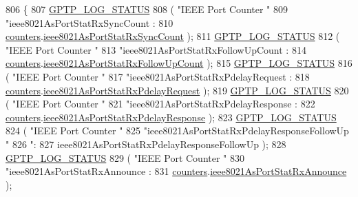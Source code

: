 \begin{DoxyCode}
806     \{
807         \hyperlink{gptp__log_8hpp_a9bcf107d6f77d335b92bbc4825ea85a3}{GPTP\_LOG\_STATUS}
808             ( \textcolor{stringliteral}{"IEEE Port Counter "}
809               \textcolor{stringliteral}{"ieee8021AsPortStatRxSyncCount : %
810               \hyperlink{class_common_port_aa7b0659a6104355b95878f69b0aefb69}{counters}.\hyperlink{struct_port_counters__t_ac36dc6016c10e50c7bc588bd0b9c3215}{ieee8021AsPortStatRxSyncCount} );
811         \hyperlink{gptp__log_8hpp_a9bcf107d6f77d335b92bbc4825ea85a3}{GPTP\_LOG\_STATUS}
812             ( \textcolor{stringliteral}{"IEEE Port Counter "}
813               \textcolor{stringliteral}{"ieee8021AsPortStatRxFollowUpCount : %
814               \hyperlink{class_common_port_aa7b0659a6104355b95878f69b0aefb69}{counters}.\hyperlink{struct_port_counters__t_af8699c2df41882d566e9a9e788550f0b}{ieee8021AsPortStatRxFollowUpCount} );
815         \hyperlink{gptp__log_8hpp_a9bcf107d6f77d335b92bbc4825ea85a3}{GPTP\_LOG\_STATUS}
816             ( \textcolor{stringliteral}{"IEEE Port Counter "}
817               \textcolor{stringliteral}{"ieee8021AsPortStatRxPdelayRequest : %
818               \hyperlink{class_common_port_aa7b0659a6104355b95878f69b0aefb69}{counters}.\hyperlink{struct_port_counters__t_ab811057f41eb0aad0df7974d38d6f2b2}{ieee8021AsPortStatRxPdelayRequest} );
819         \hyperlink{gptp__log_8hpp_a9bcf107d6f77d335b92bbc4825ea85a3}{GPTP\_LOG\_STATUS}
820             ( \textcolor{stringliteral}{"IEEE Port Counter "}
821               \textcolor{stringliteral}{"ieee8021AsPortStatRxPdelayResponse : %
822               \hyperlink{class_common_port_aa7b0659a6104355b95878f69b0aefb69}{counters}.\hyperlink{struct_port_counters__t_a75b087534d53a5127674d61a70903a6b}{ieee8021AsPortStatRxPdelayResponse} );
823         \hyperlink{gptp__log_8hpp_a9bcf107d6f77d335b92bbc4825ea85a3}{GPTP\_LOG\_STATUS}
824             ( \textcolor{stringliteral}{"IEEE Port Counter "}
825               \textcolor{stringliteral}{"ieee8021AsPortStatRxPdelayResponseFollowUp "}
826               \textcolor{stringliteral}{": %
827               ieee8021AsPortStatRxPdelayResponseFollowUp );
828         \hyperlink{gptp__log_8hpp_a9bcf107d6f77d335b92bbc4825ea85a3}{GPTP\_LOG\_STATUS}
829             ( \textcolor{stringliteral}{"IEEE Port Counter "}
830               \textcolor{stringliteral}{"ieee8021AsPortStatRxAnnounce : %
831               \hyperlink{class_common_port_aa7b0659a6104355b95878f69b0aefb69}{counters}.\hyperlink{struct_port_counters__t_a38f25ba31521155ed8827ddfa43e8060}{ieee8021AsPortStatRxAnnounce} );
}}}}}}
\end{DoxyCode}
